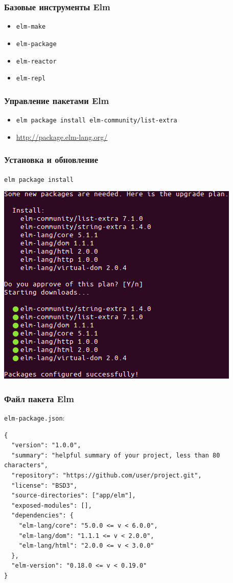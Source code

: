 \documentclass[11pt,aspectratio=169]{beamer}
\begin{document}
\begin{frame}
\frametitle{Базовые инструменты Elm}
\begin{itemize}
	\item \texttt{elm-make}
	\item \texttt{elm-package}
	\item \texttt{elm-reactor}
	\item \texttt{elm-repl}
\end{itemize}
\end{frame}

\begin{frame}
\frametitle{Управление пакетами Elm}
\begin{itemize}
	\item \texttt{elm package install elm-community/list-extra}
	\item \url{http://package.elm-lang.org/}
\end{itemize}
\end{frame}

\begin{frame}
\frametitle{Установка и обновление}
\center\texttt{elm package install}

\includegraphics[scale=0.45]{elm-package-install}
\end{frame}

\begin{frame}[fragile]
\frametitle{Файл пакета Elm}
\texttt{elm-package.json}:
\begin{lstlisting}
{
  "version": "1.0.0",
  "summary": "helpful summary of your project, less than 80 characters",
  "repository": "https://github.com/user/project.git",
  "license": "BSD3",
  "source-directories": ["app/elm"],
  "exposed-modules": [],
  "dependencies": {
    "elm-lang/core": "5.0.0 <= v < 6.0.0",
    "elm-lang/dom": "1.1.1 <= v < 2.0.0",
    "elm-lang/html": "2.0.0 <= v < 3.0.0"
  },
  "elm-version": "0.18.0 <= v < 0.19.0"
}
\end{lstlisting}
\end{frame}
\end{document}
